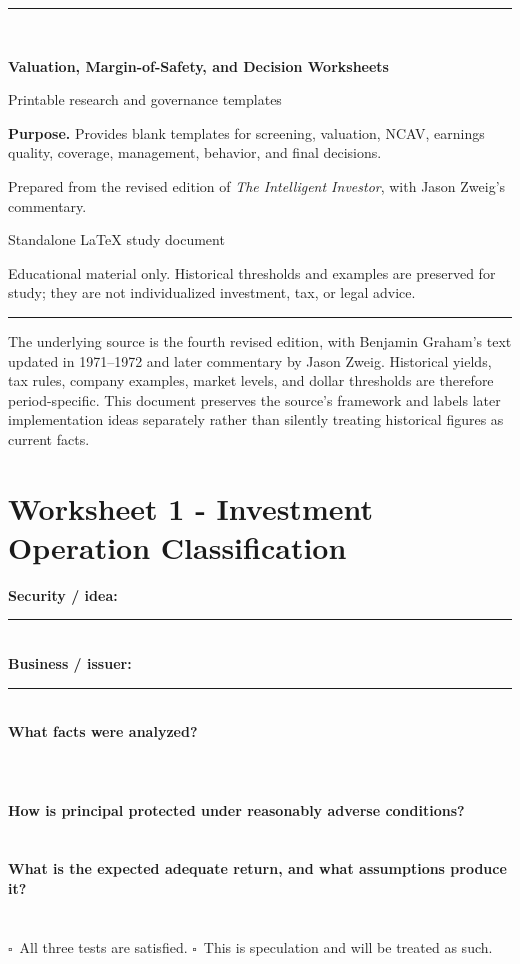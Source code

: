 \documentclass[11pt]{article}
\newcommand{\checkbox}{\(\square\)}
\newcommand{\blankline}{\makebox[\linewidth][l]{\rule{0.96\linewidth}{0.35pt}}}
\newcommand{\makedoccover}[4]{%
\hypersetup{pageanchor=false}%
\begin{titlepage}
\thispagestyle{empty}
\vspace*{1.0in}
{\color{Navy}\rule{\linewidth}{2.2pt}}\\[0.55in]
{\Huge\bfseries\color{Navy} #1\par}
\vspace{0.18in}
{\Large\color{Teal} #2\par}
\vspace{0.5in}
\begin{tcolorbox}[colback=LightGray,colframe=Gray,boxrule=0.5pt,arc=2mm]
\textbf{Purpose.} #3
\end{tcolorbox}
\vfill
{\large Prepared from the revised edition of \textit{The Intelligent Investor}, with Jason Zweig's commentary.\par}
\vspace{0.12in}
{\small #4\par}
\vspace{0.25in}
{\small\color{Gray}\parbox{0.90\textwidth}{\centering Educational material only. Historical thresholds and examples are preserved for study; they are not individualized investment, tax, or legal advice.}}\par
\vspace{0.35in}
{\color{Navy}\rule{\linewidth}{2.2pt}}
\end{titlepage}\hypersetup{pageanchor=true}
}
\begin{document}
\makedoccover{Valuation, Margin-of-Safety, and Decision Worksheets}{Printable research and governance templates}{Provides blank templates for screening, valuation, NCAV, earnings quality, coverage, management, behavior, and final decisions.}{Standalone LaTeX study document}
\tableofcontents\newpage

\begin{cautionbox}
The underlying source is the fourth revised edition, with Benjamin Graham's text updated in 1971--1972 and later commentary by Jason Zweig. Historical yields, tax rules, company examples, market levels, and dollar thresholds are therefore period-specific. This document preserves the source's framework and labels later implementation ideas separately rather than silently treating historical figures as current facts.
\end{cautionbox}

\section{Worksheet 1 - Investment Operation Classification}
\begin{worksheetbox}
\textbf{Security / idea:} \rule{0.70\linewidth}{0.35pt}\\[8pt]
\textbf{Business / issuer:} \rule{0.68\linewidth}{0.35pt}\\[8pt]
\textbf{What facts were analyzed?}\\[4pt]
\blankline\\[10pt]\blankline\\[10pt]\blankline\\[10pt]
\textbf{How is principal protected under reasonably adverse conditions?}\\[4pt]
\blankline\\[10pt]\blankline\\[10pt]
\textbf{What is the expected adequate return, and what assumptions produce it?}\\[4pt]
\blankline\\[10pt]\blankline\\[10pt]
\checkbox\ All three tests are satisfied. \quad \checkbox\ This is speculation and will be treated as such.
\end{worksheetbox}
\end{document}
